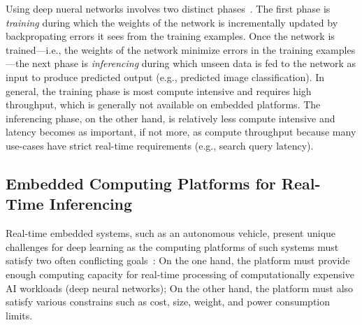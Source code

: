 Using deep nueral networks involves two distinct
phases~\cite{NVIDIA2015}. The first
phase is \emph{training} during which the weights of the network is
incrementally updated by backpropating errors it sees from the
training examples. Once the network is trained---i.e., the weights of
the network minimize errors in the training examples---the next phase
is \emph{inferencing} during which unseen data is fed to the network
as input to produce predicted output (e.g., predicted image
classification). In general, the training phase is most compute
intensive and requires high throughput, which is generally not
available on embedded platforms. The inferencing phase, on the
other hand, is relatively less compute intensive and latency becomes
as important, if not more, as compute throughput because many
use-cases have strict real-time requirements (e.g., search query
latency).





\subsection{Embedded Computing Platforms for Real-Time Inferencing}
Real-time embedded systems, such as an autonomous vehicle, present
unique challenges for deep learning as the computing platforms of such
systems must satisfy two often conflicting goals~\cite{Otterness2017}:
On the one hand, the platform must provide 
enough computing capacity for real-time processing of computationally
expensive AI workloads (deep neural networks);
On the other hand, the platform must also satisfy various
constrains such as cost, size, weight, and power consumption limits.

